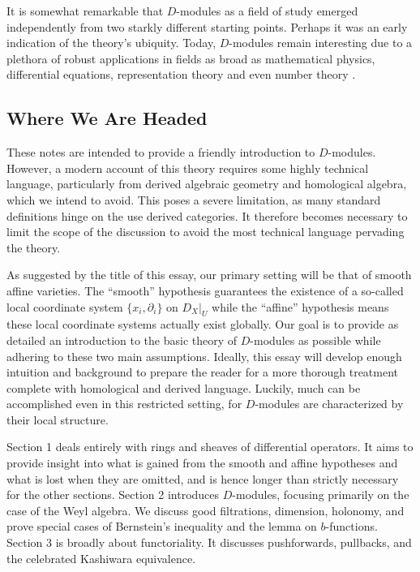 It is somewhat remarkable that $D$-modules as a field of study emerged independently from two starkly different starting points. Perhaps it was an early indication of the theory's ubiquity. Today, $D$-modules remain interesting due to a plethora of robust applications in fields as broad as mathematical physics, differential equations, representation theory and even number theory .

\subsection*{Where We Are Headed}
\noindent These notes are intended to provide a friendly introduction to $D$-modules. However, a modern account of this theory requires some highly technical language, particularly from derived algebraic geometry and homological algebra, which we intend to avoid. This poses a severe limitation, as many standard definitions hinge on the use derived categories. It therefore becomes necessary to limit the scope of the discussion to avoid the most technical language pervading the theory. 

As suggested by the title of this essay, our primary setting will be that of smooth affine varieties. The ``smooth'' hypothesis guarantees the existence of a so-called local coordinate system $\{x_i,\partial_i\}$ on $D_X|_U$ while the ``affine'' hypothesis means these local coordinate systems actually exist globally. Our goal is to provide as detailed an introduction to the basic theory of $D$-modules as possible while adhering to these two main assumptions. Ideally, this essay will develop enough intuition and background to prepare the reader for a more thorough treatment complete with homological and derived language. Luckily, much can be accomplished even in this restricted setting, for $D$-modules are characterized by their local structure.

Section 1 deals entirely with rings and sheaves of differential operators. It aims to provide insight into what is gained from the smooth and affine hypotheses and what is lost when they are omitted, and is hence longer than strictly necessary for the other sections. Section 2 introduces $D$-modules, focusing primarily on the case of the Weyl algebra. We discuss good filtrations, dimension, holonomy, and prove special cases of Bernstein's inequality and the lemma on $b$-functions. Section 3 is broadly about functoriality. It discusses pushforwards, pullbacks, and the celebrated Kashiwara equivalence.

